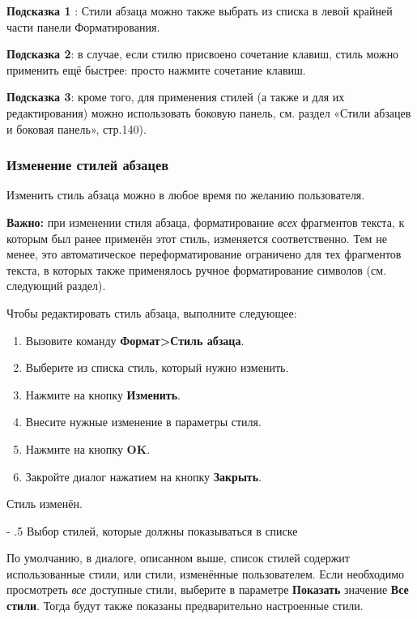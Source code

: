 \documentclass[a4paper,10pt]{article}
\makeatletter
\renewcommand\paragraph{%
   \@startsection{paragraph}{4}{0mm}%
      {-\baselineskip}%
      {.5\baselineskip}%
      {\normalfont\normalsize\bfseries}}
\makeatother
\begin{document}
\begin{mdframed}[backgroundcolor=blue!10]
\textbf{Подсказка 1 }: Стили абзаца можно также выбрать из списка в левой крайней части панели Форматирования.

\textbf{Подсказка 2}: в случае, если стилю присвоено сочетание клавиш, стиль можно применить ещё быстрее: просто нажмите сочетание клавиш.

\textbf{Подсказка 3}: кроме того, для применения стилей (а также и для их редактирования) можно использовать боковую панель, см. раздел «Стили абзацев и боковая панель», стр.140).
\end{mdframed}

\subsubsection{Изменение стилей абзацев}
Изменить стиль абзаца можно в любое время по желанию пользователя.

\begin{mdframed}[backgroundcolor=blue!10]
\textbf{Важно:} при изменении стиля абзаца, форматирование \textit{всех} фрагментов текста, к которым был ранее применён этот стиль, изменяется соответственно. Тем не менее, это автоматическое переформатирование ограничено для тех фрагментов текста, в которых также применялось ручное форматирование символов (см. следующий раздел).
\end{mdframed}

Чтобы редактировать стиль абзаца, выполните следующее:
\begin{enumerate}
 \item Вызовите команду \textbf{Формат>Стиль абзаца}.
 \item Выберите из списка стиль, который нужно изменить.
 \item Нажмите на кнопку \textbf{Изменить}.
 \item Внесите нужные изменение в параметры стиля.
 \item Нажмите на кнопку \textbf{OK}.
 \item Закройте диалог нажатием на кнопку \textbf{Закрыть}.
\end{enumerate}

Стиль изменён.

\paragraph{Выбор стилей, которые должны показываться в списке}

По умолчанию, в диалоге, описанном выше, список стилей содержит использованные стили, или стили, изменённые пользователем. Если необходимо просмотреть \textit{все} доступные стили, выберите в параметре \textbf{Показать} значение \textbf{Все стили}. Тогда будут также показаны предварительно настроенные стили.
\end{document}
